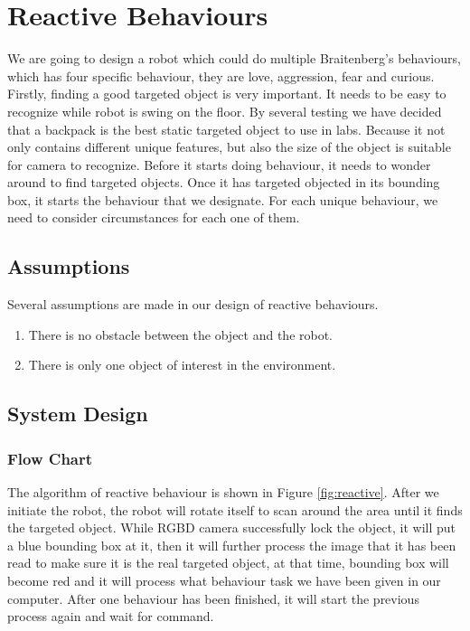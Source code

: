 \chapter{Reactive Behaviours}
\label{chap:reactive}

We are going to design a robot which could do multiple Braitenberg’s behaviours, which has four specific behaviour, they are love, aggression, fear and curious. 
Firstly, finding a good targeted object is very important. It needs to be easy to recognize while robot is swing on the floor. 
By several testing we have decided that a backpack is the best static targeted object to use in labs. Because it not only contains different unique features, but also the size of the object is suitable for camera to recognize. 
Before it starts doing behaviour, it needs to wonder around to find targeted objects. 
Once it has targeted objected in its bounding box, it starts the behaviour that we designate. 
For each unique behaviour, we need to consider circumstances for each one of them.

\section{Assumptions}

Several assumptions are made in our design of reactive behaviours.

\begin{enumerate}
    \item There is no obstacle between the object and the robot.
    \item There is only one object of interest in the environment.
\end{enumerate}


\section{System Design}

\subsection{Flow Chart}

The algorithm of reactive behaviour is shown in Figure \ref{fig:reactive}. After we initiate the robot, the robot will rotate itself to scan around the area until it finds the targeted object.  While RGBD camera successfully lock the object, it will put a blue bounding box at it, then it will further process the image that it has been read to make sure it is the real targeted object, at that time, bounding box will become red and it will process what behaviour task we have been given in our computer. 
After one behaviour has been finished, it will start the previous process again and wait for command.

